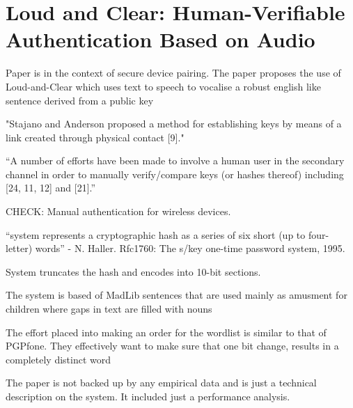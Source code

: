\section{Loud and Clear: Human-Verifiable Authentication Based on Audio}

Paper is in the context of secure device pairing. The paper proposes the use of Loud-and-Clear which uses text to speech to vocalise a robust english like sentence derived from a public key


"Stajano and Anderson proposed a method
for establishing keys by means of a link created through physical contact [9]."

``A number of efforts have been made to involve a human user in the secondary channel in order to manually verify/compare
keys (or hashes thereof) including [24, 11, 12] and [21].''

CHECK: Manual authentication for wireless devices.

``system represents a cryptographic hash as a series of six short (up to four-
letter) words'' - N. Haller. Rfc1760: The s/key one-time password system, 1995.

System truncates the hash and encodes into 10-bit sections.

The system is based of MadLib sentences that are used mainly as amusment for children where gaps in text are filled with nouns

The effort placed into making an order for the wordlist is similar to that of PGPfone. They effectively want to make sure that one bit change, results in a completely distinct word

The paper is not backed up by any empirical data and is just a technical description on the system. It included just a performance analysis.